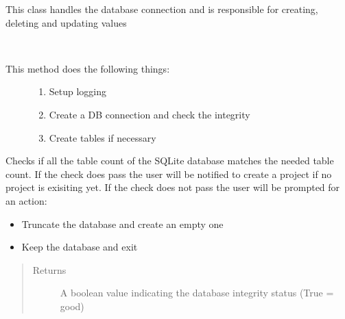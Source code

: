 \documentclass[letterpaper,10pt,english]{sphinxmanual}
\begin{document}
\begin{fulllineitems}
\label{\detokenize{src:src.Database.Database}}
This class handles the database connection and is responsible for creating, deleting and updating values

\begin{fulllineitems}
\label{\detokenize{src:src.Database.Database.__init__}}~\begin{description}
\item[{This method does the following things:}] \leavevmode\begin{enumerate}
\item {} 
Setup logging

\item {} 
Create a DB connection and check the integrity

\item {} 
Create tables if necessary

\end{enumerate}

\end{description}

\end{fulllineitems}


\begin{fulllineitems}
\label{\detokenize{src:src.Database.Database.checkDB}}
Checks if all the table count of the SQLite database matches the needed table count.
If the check does pass the user will be notified to create a project if no project is exisiting yet.
If the check does not pass the user will be prompted for an action:
\begin{itemize}
\item {} 
Truncate the database and create an empty one

\item {} 
Keep the database and exit

\end{itemize}
\begin{quote}\begin{description}
\item[{Returns}] \leavevmode
A boolean value indicating the database integrity status (True = good)


\end{description}
\end{quote}
\end{fulllineitems}
\end{fulllineitems}
\end{document}
